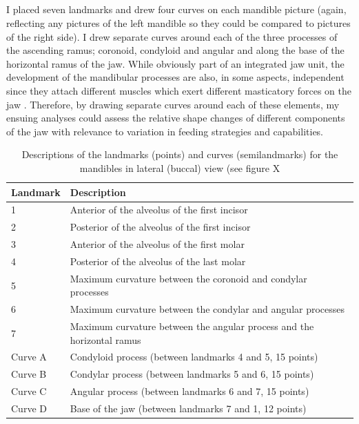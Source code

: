 \subsection{}
I placed seven landmarks and drew four curves on each mandible picture (again, reflecting any pictures of the left mandible so they could be compared to pictures of the right side). I drew separate curves around each of the three processes of the ascending ramus; coronoid, condyloid and angular and along the base of the horizontal ramus of the jaw. While obviously part of an integrated jaw unit, the development of the mandibular processes are also, in some aspects, independent since they attach different muscles which exert different masticatory forces on the jaw \citep{Barrow2008}. Therefore, by drawing separate curves around each of these elements, my ensuing analyses could assess the relative shape changes of different components of the jaw with relevance to variation in feeding strategies and capabilities.


\begin{table}[h]			
\centering
\caption[Mandibles' landmarks]
	{Descriptions of the landmarks (points) and curves (semilandmarks) for the mandibles in lateral (buccal) view (see figure X}
\begin{tabular}[t]{l l}		
\hline
\textbf{Landmark} & \textbf{Description} \\
\hline
1 & Anterior of the alveolus of the first incisor \\
2 & Posterior of the alveolus of the first incisor \\
3 &	Anterior of the alveolus of the first molar \\
4 & Posterior of the alveolus of the last molar \\
5 & Maximum curvature between the coronoid and condylar processes\\
6 & Maximum curvature between the condylar and angular processes  \\
7 &	Maximum curvature between the angular process and the horizontal ramus \\
\hline
Curve A & Condyloid process (between landmarks 4 and 5, 15 points)\\
Curve B & Condylar process (between landmarks 5 and 6, 15 points) \\
Curve C & Angular process (between landmarks 6 and 7, 15 points)  \\
Curve D & Base of the jaw (between landmarks 7 and 1, 12 points)  \\
\hline
\end{tabular}
\label{mandslanddesc} %
\end{table}


